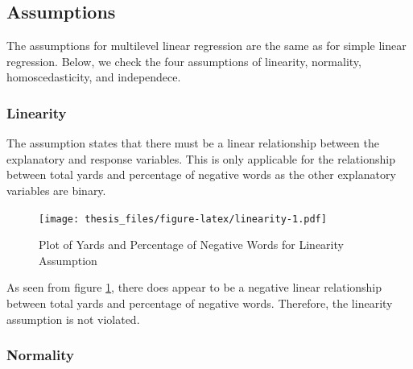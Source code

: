 \documentclass[12pt,twoside]{reedthesis}
\begin{document}
\subsection{Assumptions}\label{assumptions}

The assumptions for multilevel linear regression are the same as for
simple linear regression. Below, we check the four assumptions of
linearity, normality, homoscedasticity, and independece.

\subsubsection{Linearity}\label{linearity}

The assumption states that there must be a linear relationship between
the explanatory and response variables. This is only applicable for the
relationship between total yards and percentage of negative words as the
other explanatory variables are binary.
\begin{figure}
\centering
\texttt{[image: thesis\_files/figure-latex/linearity-1.pdf]}
\caption{\label{fig:linearity}Plot of Yards and Percentage of Negative Words
for Linearity Assumption}
\end{figure}
As seen from figure \ref{fig:linearity}, there does appear to be a
negative linear relationship between total yards and percentage of
negative words. Therefore, the linearity assumption is not violated.

\subsubsection{Normality}\label{normality}
\end{document}
